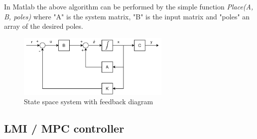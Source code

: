 In Matlab the above algorithm can be performed by the simple function \textit{Place(A, B, poles)} where "A" is the system matrix, "B" is the input matrix and "poles" an array of the desired poles.

\begin{figure}[h!]
	\centering
	\includegraphics[width=0.65\textwidth]{Graphics/State_space_feedback.pdf}
	\caption{State space system with feedback diagram}
	\label{fig:state_space_fb}
\end{figure}






\subsection{LMI / MPC controller}
